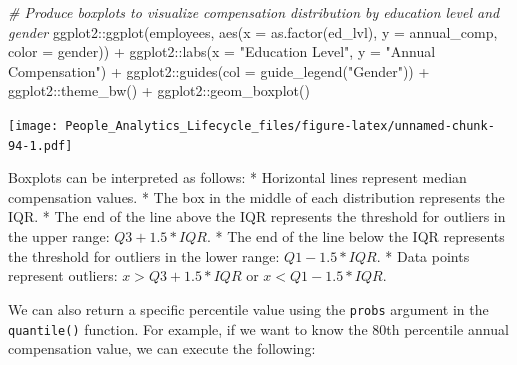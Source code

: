 \documentclass[
]{book}
\newenvironment{Shaded}{\begin{snugshade}}{\end{snugshade}}
\newcommand{\AttributeTok}[1]{\textcolor[rgb]{0.77,0.63,0.00}{#1}}
\newcommand{\CommentTok}[1]{\textcolor[rgb]{0.56,0.35,0.01}{\textit{#1}}}
\newcommand{\DecValTok}[1]{\textcolor[rgb]{0.00,0.00,0.81}{#1}}
\newcommand{\FunctionTok}[1]{\textcolor[rgb]{0.00,0.00,0.00}{#1}}
\newcommand{\NormalTok}[1]{#1}
\newcommand{\SpecialCharTok}[1]{\textcolor[rgb]{0.00,0.00,0.00}{#1}}
\newcommand{\StringTok}[1]{\textcolor[rgb]{0.31,0.60,0.02}{#1}}
\begin{document}
\begin{Shaded}
\begin{Highlighting}[]
\CommentTok{\# Produce boxplots to visualize compensation distribution by education level and gender}
\NormalTok{ggplot2}\SpecialCharTok{::}\FunctionTok{ggplot}\NormalTok{(employees, }\FunctionTok{aes}\NormalTok{(}\AttributeTok{x =} \FunctionTok{as.factor}\NormalTok{(ed\_lvl), }\AttributeTok{y =}\NormalTok{ annual\_comp, }\AttributeTok{color =}\NormalTok{ gender)) }\SpecialCharTok{+}
\NormalTok{ggplot2}\SpecialCharTok{::}\FunctionTok{labs}\NormalTok{(}\AttributeTok{x =} \StringTok{"Education Level"}\NormalTok{, }\AttributeTok{y =} \StringTok{"Annual Compensation"}\NormalTok{) }\SpecialCharTok{+} 
\NormalTok{ggplot2}\SpecialCharTok{::}\FunctionTok{guides}\NormalTok{(}\AttributeTok{col =} \FunctionTok{guide\_legend}\NormalTok{(}\StringTok{"Gender"}\NormalTok{)) }\SpecialCharTok{+}
\NormalTok{ggplot2}\SpecialCharTok{::}\FunctionTok{theme\_bw}\NormalTok{() }\SpecialCharTok{+}
\NormalTok{ggplot2}\SpecialCharTok{::}\FunctionTok{geom\_boxplot}\NormalTok{()}
\end{Highlighting}
\end{Shaded}

\texttt{[image: People\_Analytics\_Lifecycle\_files/figure-latex/unnamed-chunk-94-1.pdf]}

Boxplots can be interpreted as follows:
* Horizontal lines represent median compensation values.
* The box in the middle of each distribution represents the IQR.
* The end of the line above the IQR represents the threshold for outliers in the upper range: \(Q3 + 1.5 * IQR\).
* The end of the line below the IQR represents the threshold for outliers in the lower range: \(Q1 - 1.5 * IQR\).
* Data points represent outliers: \(x > Q3 + 1.5 * IQR\) or \(x < Q1 - 1.5 * IQR\).

We can also return a specific percentile value using the \texttt{probs} argument in the \texttt{quantile()} function. For example, if we want to know the 80th percentile annual compensation value, we can execute the following:

\begin{Shaded}
\end{Shaded}
\end{document}
